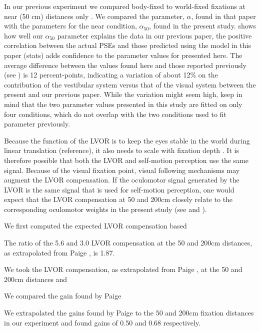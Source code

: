 In our previous experiment we compared body-fixed to world-fixed fixations at near (50 \si{\centi\metre}) distances only \cite{clemens2015a}. We compared the parameter, $\alpha$, found in that paper with the parameters for the near condition, $\alpha_{50}$, found in the present study.  shows how well our $\alpha_{50}$ parameter explains the data in our previous paper, the positive correlation between the actual PSEs and those predicted using the model in this paper (stats) adds confidence to the parameter values for  presented here. The average difference between the values found here and those reported previously (see ) is 12  percent-points, indicating a variation of about 12\% on the contribution of the vestibular system versus that of the visual system between the present and our previous paper. While the variation might seem high, keep in mind that the two parameter values presented in this study are fitted on only four conditions, which do not overlap with the two conditions used to fit  parameter  previously.

Because the function of the LVOR is to keep the eyes stable in the world during linear translation (reference), it also needs to scale with fixation depth \cite{paige1989, busettini1994,paige1998}. It is therefore possible that both the LVOR and self-motion perception use the same signal. Because of the visual fixation point, visual following mechanisms may augment the LVOR compensation. If the oculomotor signal generated by the LVOR is the same signal that is used for self-motion perception, one would expect that the LVOR compensation at 50 and 200cm closely relate to the corresponding oculomotor weights in the present study (see  and ).




We first computed the expected LVOR compensation based 

The ratio of the 5.6 and 3.0 \textdegree LVOR compensation at the 50 and 200cm distances, as extrapolated from Paige \citeyear{1989}, is 1.87.

We took the LVOR compensation, as extrapolated from Paige \citeyear{paige1989}, at the 50 and 200cm distances and 


We compared the gain found by Paige \citeyear{paige1989} 

We extrapolated the gains found by Paige \citeyear{paige1989} to the 50 and 200cm fixation distances in our experiment and found gains of 0.50 and 0.68 respectively.


